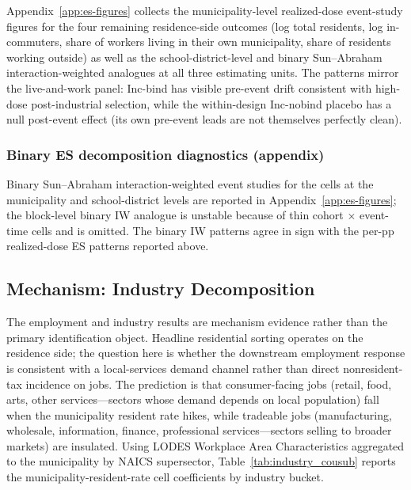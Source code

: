 \documentclass[12pt]{article}
\begin{document}
Appendix~\ref{app:es-figures} collects the municipality-level realized-dose
event-study figures for the four remaining residence-side outcomes
(log total residents, log in-commuters, share of workers living in
their own municipality, share of residents working outside) as well as the
school-district-level and binary Sun--Abraham interaction-weighted
analogues at all three estimating units. The patterns mirror the
live-and-work panel: Inc-bind has visible pre-event drift consistent
with high-dose post-industrial selection, while the within-design
Inc-nobind placebo has a null post-event effect (its own pre-event
leads are not themselves perfectly clean).

\subsubsection{Binary ES decomposition diagnostics (appendix)}
\label{subsubsec:decomp-binary-es}

Binary Sun--Abraham interaction-weighted event studies for the
cells at the municipality and school-district levels
are reported in Appendix~\ref{app:es-figures}; the block-level
binary IW analogue is unstable because of thin cohort $\times$
event-time cells and is omitted. The binary IW patterns agree in
sign with the per-pp realized-dose ES patterns reported above.

\subsection{Mechanism: Industry Decomposition}
\label{subsec:het-industry}

The employment and industry results are mechanism evidence rather
than the primary identification object. Headline residential sorting
operates on the residence side; the question here is whether the
downstream employment response is consistent with a local-services
demand channel rather than direct nonresident-tax incidence on jobs.
The prediction is that consumer-facing jobs (retail, food, arts,
other services---sectors whose demand depends on local population)
fall when the municipality resident rate hikes, while tradeable jobs
(manufacturing, wholesale, information, finance, professional
services---sectors selling to broader markets) are insulated. Using
LODES Workplace Area Characteristics aggregated to the municipality
by NAICS supersector, Table~\ref{tab:industry_cousub} reports the
municipality-resident-rate cell coefficients by industry bucket.


\end{document}
